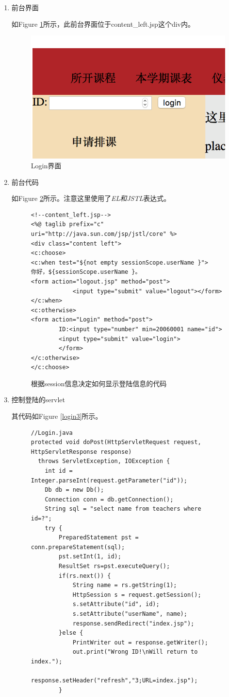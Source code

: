 \begin{enumerate}
\item
前台界面

如Figure \ref{login1}所示，此前台界面位于content\_left.jsp这个div内。
\begin{figure}
\includegraphics{Login1}
\caption{Login界面}
\label{login1}
\end{figure}
\item
前台代码

如Figure \ref{login2}所示。注意这里使用了\emph{EL和JSTL}表达式。

\begin{figure}
\begin{verbatim}
<!--content_left.jsp-->
<%@ taglib prefix="c" uri="http://java.sun.com/jsp/jstl/core" %>
<div class="content left">
<c:choose>
<c:when test="${not empty sessionScope.userName }">
你好，${sessionScope.userName }。
<form action="logout.jsp" method="post">
			<input type="submit" value="logout"></form>
</c:when>
<c:otherwise>
<form action="Login" method="post">
		ID:<input type="number" min=20060001 name="id">
		<input type="submit" value="login">
		</form>
</c:otherwise>
</c:choose>
\end{verbatim}
\caption{根据session信息决定如何显示登陆信息的代码}
\label{login2}
\end{figure}

\item
控制登陆的servlet

其代码如Figure \ref{login3}所示。
\begin{figure}
\begin{lstlisting}
//Login.java
protected void doPost(HttpServletRequest request, HttpServletResponse response) 
  throws ServletException, IOException {
	int id = Integer.parseInt(request.getParameter("id"));
	Db db = new Db();
	Connection conn = db.getConnection();
	String sql = "select name from teachers where id=?";
	try {
		PreparedStatement pst = conn.prepareStatement(sql);
		pst.setInt(1, id);
		ResultSet rs=pst.executeQuery();
		if(rs.next()) {
			String name = rs.getString(1);
			HttpSession s = request.getSession();
			s.setAttribute("id", id);
			s.setAttribute("userName", name);
			response.sendRedirect("index.jsp");
		}else {
			PrintWriter out = response.getWriter();
			out.print("Wrong ID!\nWill return to index.");
			response.setHeader("refresh","3;URL=index.jsp");
		}
		

\end{lstlisting}
\end{figure}
\end{enumerate}
